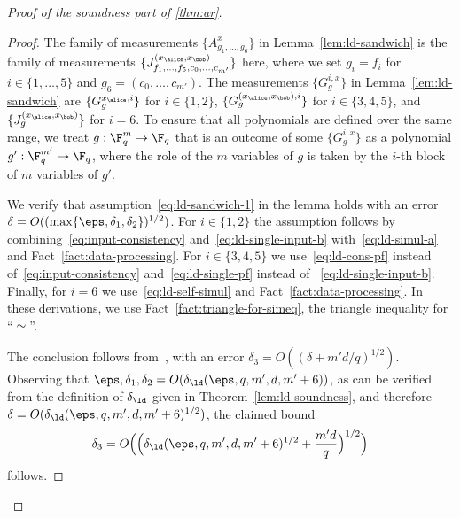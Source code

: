 \begin{proof}[Proof of the soundness part of \cref{thm:ar}]
\begin{proof}
    The family of measurements $\{A^x_{g_1,\ldots,g_6}\}$ in
    Lemma~\ref{lem:ld-sandwich} is the family of measurements
    $\{J^{(x_\alice,x_\bob)}_{f_1,\ldots,f_5,c_0,\ldots,c_{m'}}\}$ here, where
    we set $g_i = f_i$ for $i\in \{1,\ldots,5\}$ and $g_6 =
    (c_0,\ldots,c_{m'})$.
    The measurements $\{G^{i,x}_g\}$ in Lemma~\ref{lem:ld-sandwich} are
    $\{G^{x_\alice,i}_{g}\}$ for $i\in \{1,2\}$,
    $\{G^{(x_\alice,x_\bob),i}_{g}\}$ for $i\in \{3,4,5\}$, and
    $\{J^{(x_\alice,x_\bob)}_g\}$ for $i=6$.
    To ensure that all polynomials are defined over the same range, we treat
    $g:\F_q^m \to \F_q$ that is an outcome of some $\{G^{i,x}_g\}$ as a
    polynomial $g':\F_q^{m'} \to \F_q$, where the role of the $m$ variables of
    $g$ is taken by the $i$-th block of $m$ variables of $g'$.

    We verify that assumption~\eqref{eq:ld-sandwich-1} in the lemma
    holds with an error $\delta = O((\max\{\eps, \delta_1, \delta_2\})^{1/2})$.
    For $i\in\{1,2\}$ the assumption follows by
    combining~\eqref{eq:input-consistency} and~\eqref{eq:ld-single-input-b}
    with~\eqref{eq:ld-simul-a} and Fact~\ref{fact:data-processing}.
    For $i\in \{3,4,5\}$ we use~\eqref{eq:ld-cons-pf} instead
    of~\eqref{eq:input-consistency} and~\eqref{eq:ld-single-pf} instead of
    ~\eqref{eq:ld-single-input-b}.
    Finally, for $i=6$ we use~\eqref{eq:ld-self-simul} and
    Fact~\ref{fact:data-processing}.
    In these derivations, we use Fact~\ref{fact:triangle-for-simeq}, the
    triangle inequality for ``$\simeq$''.

    The conclusion follows from~, with an error
    $\delta_3 = O((\delta + m'd/q)^{1/2})$. Observing that
    $\eps,\delta_1,\delta_2 = O(\delta_{\ld}(\eps,q,m',d,m'+6))$, as can be
    verified from the definition of $\delta_{\ld}$ given in
    Theorem~\ref{lem:ld-soundness}, and therefore $\delta =
    O(\delta_{\ld}(\eps, q,m',d,m'+6)^{1/2})$, the claimed bound
    \[ \delta_3 = O\Big(\Big( \delta_{\ld}(\eps, q, m', d, m'+6)^{1/2} +
      \frac{m'd}{q} \Big)^{1/2} \Big) \]
    follows.

\end{proof}


\end{proof}
